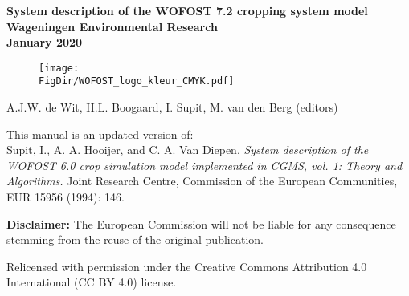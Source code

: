 \documentclass[a4paper,12pt,oneside]{book}
\newcommand{\FigDir}{D:/UserData/sources/WOFOST_system_docs/latex/figs}
\begin{document}

\frontmatter
\begin{titlepage}
	\centering
	\vfill
	{\bfseries
		{\LARGE
		System description of the WOFOST 7.2 cropping system model}\\
		\vskip0.5cm
		{\large
			Wageningen Environmental Research\\ 
   	        \vskip0.5cm
			January 2020}\\

		\begin{figure}[h]
		\texttt{[image: \\FigDir/WOFOST\_logo\_kleur\_CMYK.pdf]}
	    \end{figure}
		\vskip1cm

		{\large A.J.W. de Wit, H.L. Boogaard, I. Supit, M. van den Berg (editors)}\\
		\vskip0.5cm
     }
     {\small 

	This manual is an updated version of:\\
    Supit, I., A. A. Hooijer, and C. A. Van Diepen. 
	\textit{System description of the WOFOST 6.0 crop simulation model implemented in CGMS, vol. 1: 
    Theory and Algorithms.} Joint Research Centre, Commission of the European Communities, EUR 15956 
             (1994): 146.
             
    \textbf{Disclaimer:} The European Commission will not be liable for any consequence stemming from the reuse of the
     original publication.
     
    Relicensed with permission under the Creative Commons Attribution 4.0 International (CC BY 4.0) license.
    }
\end{titlepage}
\tableofcontents
\listoffigures
\listoftables
\cleardoublepage

\mainmatter







\backmatter
\appendix



\end{document}
